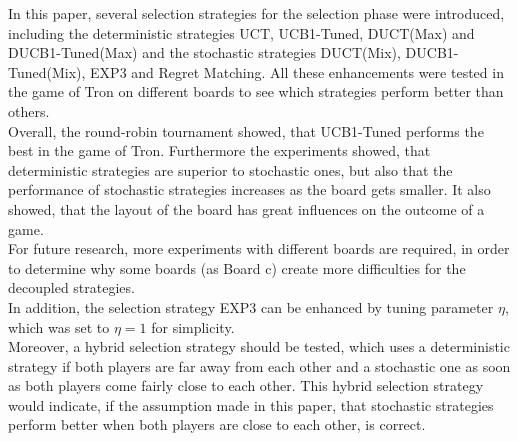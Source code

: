 \documentclass{article}
\begin{document}
In this paper, several selection strategies for the selection phase were introduced, including the deterministic strategies UCT, UCB1-Tuned, DUCT(Max) and DUCB1-Tuned(Max) and the stochastic strategies DUCT(Mix), DUCB1-Tuned(Mix), EXP3 and Regret Matching. All these enhancements were tested in the game of Tron on different boards to see which strategies perform better than others.\\
Overall, the round-robin tournament showed, that UCB1-Tuned performs the best in the game of Tron. Furthermore the experiments showed, that deterministic strategies are superior to stochastic ones, but also that the performance of stochastic strategies increases as the board gets smaller. It also showed, that the layout of the board has great influences on the outcome of a game.\\
For future research, more experiments with different boards are required, in order to determine why some boards (as Board c) create more difficulties for the decoupled strategies.\\
In addition, the selection strategy EXP3 can be enhanced by tuning parameter $\eta$, which was set to $\eta=1$ for simplicity.\\
Moreover, a hybrid selection strategy should be tested, which uses a deterministic strategy if both players are far away from each other and a stochastic one as soon as both players come fairly close to each other. This hybrid selection strategy would indicate, if the assumption made in this paper, that stochastic strategies perform better when both players are close to each other, is correct.





\end{document}
